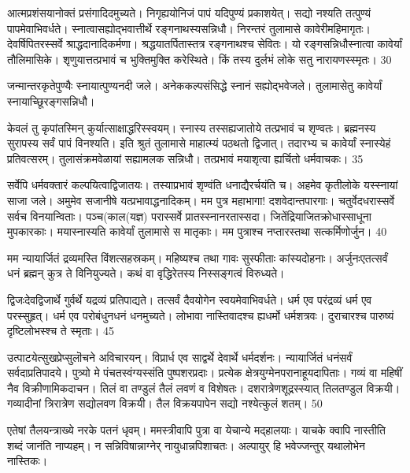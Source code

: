 आत्मप्रशंसयानोक्तं प्रसंगादिदमुच्यते।
निगृह्ययोनिजं पापं यदिपुण्यं प्रकाशयेत्।
सद्यो नश्यति तत्पुण्यं पापमेवाभिवर्धते।
स्नात्वासह्योद्भवात्तीर्थे रङ्गनाथस्यसन्निधौ।
निरन्तरं तुलामासे कावेरीमहिमागृतः।
देवर्षिपितरस्सर्वे श्राद्धदानादिकर्मणा।
श्रद्धयातर्पितास्तत्र रङ्गनाथश्च सेवितः।
यो रङ्गसन्निधौस्नात्वा कावेर्यां तौलिमासिके।
शृणुयात्तत्प्रभावं च भुक्तिमुक्ति करेस्थिते।
किं तस्य दुर्लभं लोके सतु नारायणस्स्मृतः।
30

जन्मान्तरकृतेपुण्यैः स्नायात्पुण्यनदी जले।
अनेककल्पसंसिद्धे स्नानं सह्योद्भवेजले।
तुलामासेतु कावेर्यां स्नायाच्छूिरङ्गसन्निधौ।

केवलं तु कृपांतस्मिन् कुर्यात्साक्षाद्धरिस्स्वयम्।
स्नास्य तस्सह्यजातोये तत्प्रभावं च शृण्वतः।
ब्रह्मनस्य सुरापस्य सर्वं पापं विनश्यति।
इति श्रुतं तुलामासे माहात्म्यं पठथतो द्विजात्।
तदारभ्य च कावेर्यां स्नास्येहं प्रतिवत्सरम्।
तुलासंक्रमवेळायां सह्यामलक सन्निधौ।
तत्प्रभावं मयाशृत्वा ह्यर्चितो धर्मवाचकः।
35

सर्वेपि धर्मवक्तारं कल्पयित्वाद्विजातयः।
तस्याप्रभावं शृण्वंति धनाद्यैरर्चयंति च।
अहमेव कृतीलोके यस्स्नायां साजा जले।
अमुमेव सजानीषे यत्प्रभावाद्धनादिकम्।
मम पुत्र महाभागा! दशवेदान्तपारगाः।
चतुर्वेदधरास्सर्वे सर्वच विनयान्विताः।
पञ्च(काल(यज्ञ) परास्सर्वे प्रातस्स्नानरतास्सदा।
जितेंद्रियाजितक्रोधास्साधूना मुपकारकाः।
मयास्नास्यति कावेर्यां तुलामासे स मातृकाः।
मम पुत्राश्च नप्तारस्तथा सत्कर्मिणोर्जुन।
40

मम न्यायार्जितं द्रव्यमस्ति विंशत्सहस्रकम्।
महिष्यश्च तथा गावः सुस्फीताः कांस्यदोहनाः।
अर्जुनःएतत्सर्वं धनं ब्रह्मन् कुत्र ते विनियुज्यते।
कथं वा वृद्धिरेतस्य निस्सङ्गत्वं विरुध्यते।

द्विजःदेवद्विजार्थे गुर्वर्थे यद्रव्यं प्रतिपाद्यते।
तत्सर्वं दैवयोगेन स्वयमेवाभिवर्धते।
धर्म एव परंद्रव्यं धर्म एव परस्सुहृत्।
धर्म एव परोबंधुनधनं धनमुच्यते।
लोभावा नास्तिवादश्च ह्यधर्मो धर्मशत्रवः।
दुराचारश्च पारुष्यं दृष्टिलोभस्श्च ते स्मृताः।
45

उत्पाटयेत्सुखप्रेप्सुलॊचने अविचारयन्।
विप्रार्ध एव साद्वर्थे देवार्थे धर्मदर्शनः।
न्यायार्जितं धनंसर्वं सर्वदाप्रतिपादये।
पुत्र्यो मे पंचतस्वंग्यस्संति पुष्पशरप्रदाः।
प्रत्येक क्षेत्रयुग्मेनपरानाहूयदापिताः।
गव्यं वा महिषीं नैव विक्रीणामिकदाचन।
तिलं वा तण्डुलं तैलं लवणं व विशेषतः।
दशरात्रेणशूद्रस्स्यात् तिलतण्डुल विक्रयी।
गव्यादीनां त्रिरात्रेण सद्योलवण विक्रयी।
तैल विक्रयपापेन सद्यो नश्येत्कुलं शतम्।
50

एतेषां तैलयन्त्राख्ये नरके पतनं धृवम्।
ममस्त्रीवापि पुत्रा वा येचान्ये मद्हालयाः।
याचके क्वापि नास्तीति शब्दं जानंति नाप्यहम्।
न सन्निविषान्नाग्नेर् नायुधान्नपिशाचतः।
अल्पायुर् हि भवेज्जन्तुर् यथालोभेन नास्तिकः।


